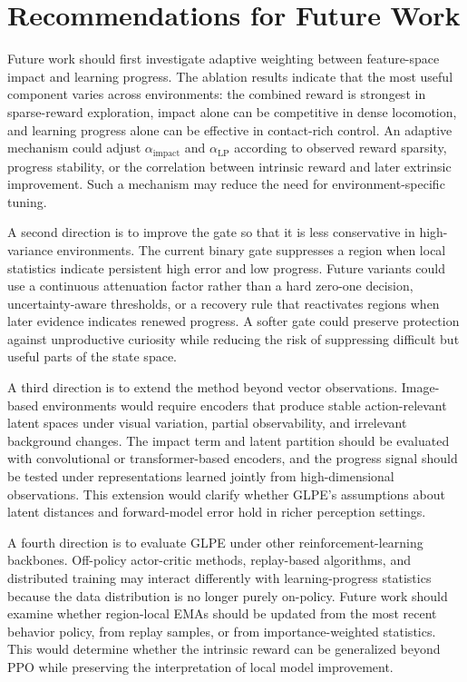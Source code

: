 \section{Recommendations for Future Work}
\label{sec:conclusion_recommendations_for_future_work}

Future work should first investigate adaptive weighting between feature-space impact and learning progress.
The ablation results indicate that the most useful component varies across environments: the combined reward is strongest in sparse-reward exploration, impact alone can be competitive in dense locomotion, and learning progress alone can be effective in contact-rich control.
An adaptive mechanism could adjust $\alpha_{\mathrm{impact}}$ and $\alpha_{\mathrm{LP}}$ according to observed reward sparsity, progress stability, or the correlation between intrinsic reward and later extrinsic improvement.
Such a mechanism may reduce the need for environment-specific tuning.

A second direction is to improve the gate so that it is less conservative in high-variance environments.
The current binary gate suppresses a region when local statistics indicate persistent high error and low progress.
Future variants could use a continuous attenuation factor rather than a hard zero-one decision, uncertainty-aware thresholds, or a recovery rule that reactivates regions when later evidence indicates renewed progress.
A softer gate could preserve protection against unproductive curiosity while reducing the risk of suppressing difficult but useful parts of the state space.

A third direction is to extend the method beyond vector observations.
Image-based environments would require encoders that produce stable action-relevant latent spaces under visual variation, partial observability, and irrelevant background changes.
The impact term and latent partition should be evaluated with convolutional or transformer-based encoders, and the progress signal should be tested under representations learned jointly from high-dimensional observations.
This extension would clarify whether GLPE's assumptions about latent distances and forward-model error hold in richer perception settings.

A fourth direction is to evaluate GLPE under other reinforcement-learning backbones.
Off-policy actor-critic methods, replay-based algorithms, and distributed training may interact differently with learning-progress statistics because the data distribution is no longer purely on-policy.
Future work should examine whether region-local EMAs should be updated from the most recent behavior policy, from replay samples, or from importance-weighted statistics.
This would determine whether the intrinsic reward can be generalized beyond PPO while preserving the interpretation of local model improvement.

